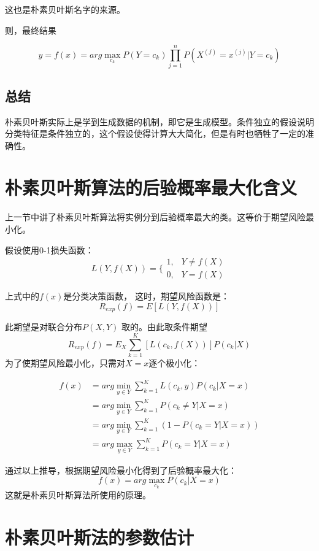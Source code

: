 \documentclass[a4paper,12pt]{book}
\begin{document}
    这也是朴素贝叶斯名字的来源。
    
    则，最终结果
    
    $$y = f(x) =arg \max_{c_k}P(Y=c_k) \prod_{j=1}^nP(X^{(j)}=x^{(j)}|Y=c_k)$$
    
    \subsection{总结}
    
    朴素贝叶斯实际上是学到生成数据的机制，即它是生成模型。条件独立的假设说明分类特征是条件独立的，这个假设使得计算大大简化，但是有时也牺牲了一定的准确性。

    \section{朴素贝叶斯算法的后验概率最大化含义}
    上一节中讲了朴素贝叶斯算法将实例分到后验概率最大的类。这等价于期望风险最小化。
 
    假设使用0-1损失函数：
    $$
    L(Y, f(X)) = \Bigg\{ \begin{array} {ll}
    1,  & Y \neq f(X) \\
    0, & Y = f(X)
    \end{array}
    $$

    上式中的$f(x)$是分类决策函数， 这时，期望风险函数是：
    $$
    R_{exp}(f)=E[L(Y, f(X))]
    $$

    此期望是对联合分布$P(X, Y)$ 取的。由此取条件期望
    $$
    R_{exp}(f) = E_X \sum_{k=1}^K[L(c_k, f(X))]P(c_k|X)
    $$
    为了使期望风险最小化，只需对$X=x$逐个极小化：
    
    \begin{equation}
        \begin{aligned}
            f(x) &=arg \min_{y \in Y} \sum_{k=1}^KL(c_k,y)P(c_k|X=x) \\
            &=arg \min_{y \in Y} \sum_{k=1}^KP(c_k \neq Y|X=x) \\
            &=arg \min_{y \in Y} \sum_{k=1}^K(1-P(c_k = Y|X=x) )\\
            &=arg \max_{y \in Y} \sum_{k=1}^KP(c_k = Y|X=x) 
        \end{aligned}
    \end{equation}


    通过以上推导，根据期望风险最小化得到了后验概率最大化：
    $$
    f(x)=arg \max_{c_k}P(c_k|X=x) 
    $$
    这就是朴素贝叶斯算法所使用的原理。

    \section{朴素贝叶斯法的参数估计}
\end{document}
